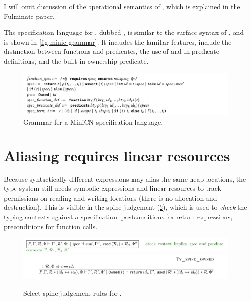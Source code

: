 I will omit discussion of the operational semantics of , which is
explained in the Fulminate paper.

The specification language for , dubbed , is similar to the
surface syntax of , and is shown in \cref{fig:minic-grammar}. It includes the
familiar features, include the distinction between functions and predicates,
the use of  and  in predicate definitions, and
the built-in ownership predicate.

\begin{figure}[tp]
    \includegraphics{figures/minicn-grammar}
    \caption{Grammar for a MiniCN specification language.}\label{fig:minicn-grammar}
\end{figure}

\section{Aliasing requires linear resources}

Because syntactically different expressions may alias the same heap locations,
the type system still needs symbolic expressions and linear resources to track
permissions on reading and writing locations (there is no allocation and
destruction). This is visible in the spine judgement (\cref{fig:minicn-spine}),
which is used to \emph{check} the typing contexts against a specification:
postconditions for return expressions, preconditions for function calls.

\begin{figure}[tpb]
    \ContinuedFloat*
    \includegraphics{figures/minicn-spine-1}
    \includegraphics{figures/minicn-spine-2}
    \caption{Select spine judgement rules for .}\label{fig:minicn-spine}
\end{figure}

